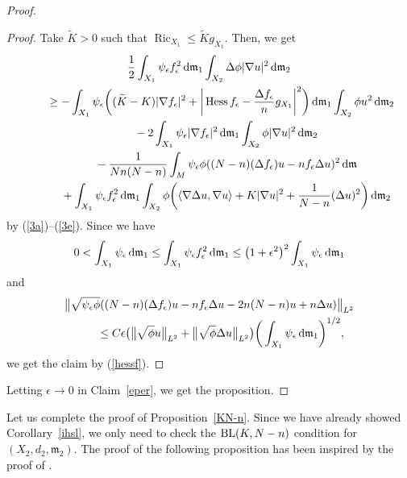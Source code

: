 \documentclass[pdftex]{sigma}
\numberwithin{equation}{section}
\theoremstyle{definition}
\newcommand{\Ric}{\operatorname{Ric}}
\newcommand{\Hess}{\operatorname{Hess}}
\newcommand{\mf}{\mathfrak{m}}
\newcommand{\BL}{{\rm BL}}
\begin{document}
\begin{proof}
\begin{proof}
Take $\widetilde{K}>0$ such that $\Ric_{X_1}\leq \widetilde{K} g_{X_1}$.
Then, we get
\begin{gather*}
\frac{1}{2}\int_{X_1}\psi_\epsilon f_\epsilon^2 \,{\rm d}\mf_1\int_{X_2}
\Delta \phi |\nabla u|^2\,{\rm d}\mf_2
\nonumber
\\ \qquad
{}\geq -\int_{X_1}\psi_\epsilon\bigg((\widetilde{K}-K)|\nabla f_\epsilon|^2 +\bigg|\Hess f_\epsilon-\frac{\Delta f_\epsilon}{n}g_{X_1}\bigg|^2\bigg)\,{\rm d}\mf_1\int_{X_2}\phi u^2\,{\rm d}\mf_2
\nonumber
\\  \qquad\quad
{}-2\int_{X_1} \psi_\epsilon |\nabla f_\epsilon|^2\,{\rm d}\mf_1\int_{X_2}\phi|\nabla u|^2\,{\rm d}\mf_2
\nonumber
\\ \qquad\quad
{}-\frac{1}{N n (N-n)}\int_M \psi_\epsilon \phi ((N-n)(\Delta f_\epsilon) u- n f_\epsilon \Delta u)^2\,{\rm d}\mf
\\  \qquad\quad
{}+\int_{X_1} \psi_\epsilon f_\epsilon^2\,{\rm d}\mf_1\int_{X_2} \phi \bigg(\langle\nabla \Delta u,\nabla u\rangle+K|\nabla u|^2+\frac{1}{N-n} (\Delta u)^2\bigg)\,{\rm d}\mf_2
\end{gather*}
by (\ref{3a})--(\ref{3e}).
Since we have
\[
0< \int_{X_1}\psi_\epsilon \,{\rm d}\mf_1\leq \int_{X_1}\psi_\epsilon f_\epsilon^2\,{\rm d}\mf_1\leq \big(1+\epsilon^2\big)^2\int_{X_1}\psi_\epsilon \,{\rm d}\mf_1
\]
and
\begin{gather*}
\big\|\sqrt{\psi_\epsilon \phi}((N-n)(\Delta f_\epsilon) u- n f_\epsilon \Delta u-2n(N-n)u+n\Delta u)\big\|_{L^2}
\\ \qquad
{}\leq C\epsilon \big(\big\|\sqrt{\phi} u\big\|_{L^2}+\big\|\sqrt{\phi} \Delta u\big\|_{L^2}\big)\bigg(\int_{X_1}\psi_\epsilon \,{\rm d}\mf_1\bigg)^{1/2},
\end{gather*}
we get the claim by (\ref{hessf}).
\end{proof}

Letting $\epsilon\to 0$ in Claim~\ref{eper}, we get the proposition.
\end{proof}

Let us complete the proof of Proposition~\ref{KN-n}.
Since we have already showed Corollary~\ref{ihsl}, we only need to check the $\BL(K,N-n)$ condition for $(X_2,d_2,\mf_2)$.
The proof of the following proposition has been inspired by the proof of \cite[Theorem~1.2]{Ket1}.
\end{document}

